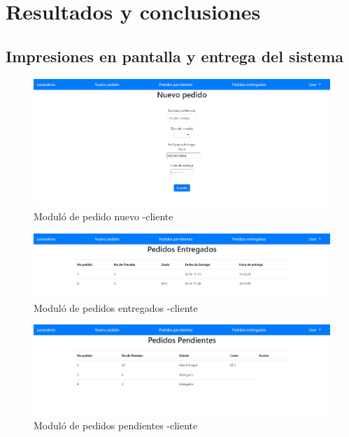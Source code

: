 \section{Resultados y conclusiones}


\subsection{Impresiones en pantalla y entrega del sistema}

\begin{figure}[htb]
\begin{center}
\includegraphics[width=12cm]{./imagenes/nuevopedido.jpg}
\end{center}
\caption{Moduló de pedido nuevo -cliente}
\end{figure}


\begin{figure}[htb]
\begin{center}
\includegraphics[width=12cm]{./imagenes/pedidosentregadoscliente.jpg}
\end{center}
\caption{Moduló de pedidos entregados -cliente}
\end{figure}

\begin{figure}[htb]
\begin{center}
\includegraphics[width=12cm]{./imagenes/pedidospendientescliente.jpg}
\end{center}
\caption{Moduló de pedidos pendientes -cliente}
\end{figure}

